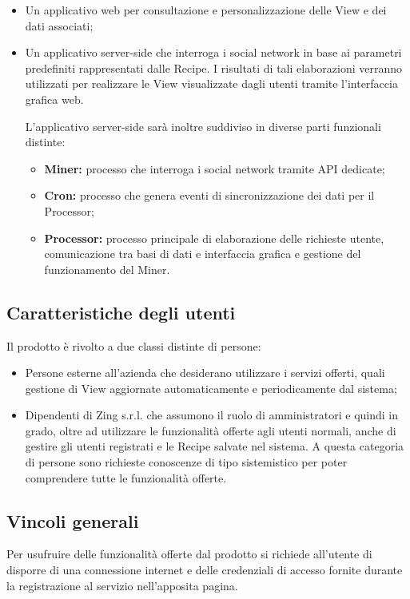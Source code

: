 \begin{itemize}
\item Un applicativo web per consultazione e personalizzazione delle View e dei dati associati;
\item Un applicativo server-side che interroga i social network in base ai parametri predefiniti rappresentati dalle Recipe. I risultati di tali elaborazioni verranno utilizzati per realizzare le View visualizzate dagli utenti tramite l'interfaccia grafica web.

L'applicativo server-side sarà inoltre suddiviso in diverse parti funzionali distinte:
\begin{itemize}
\item \textbf{Miner:} processo che interroga i social network tramite API dedicate;
\item \textbf{Cron:} processo che genera eventi di sincronizzazione dei dati per il Processor;
\item \textbf{Processor:} processo principale di elaborazione delle richieste utente, comunicazione tra basi di dati e interfaccia grafica e gestione del funzionamento del Miner.
\end{itemize}

\end{itemize}

\subsection{Caratteristiche degli utenti}
Il prodotto è rivolto a due classi distinte di persone:

\begin{itemize}
\item Persone esterne all'azienda che desiderano utilizzare i servizi offerti, quali gestione di View aggiornate automaticamente e periodicamente dal sistema;
\item Dipendenti di Zing s.r.l. che assumono il ruolo di amministratori e quindi in grado, oltre ad utilizzare le funzionalità offerte agli utenti normali, anche di gestire gli utenti registrati e le Recipe salvate nel sistema.
A questa categoria di persone sono richieste conoscenze di tipo sistemistico per poter comprendere tutte le funzionalità offerte.
\end{itemize}


\subsection{Vincoli generali}
Per usufruire delle funzionalità offerte dal prodotto si richiede all'utente di disporre
di una connessione internet e delle credenziali di accesso fornite durante la registrazione al servizio nell'apposita pagina.

